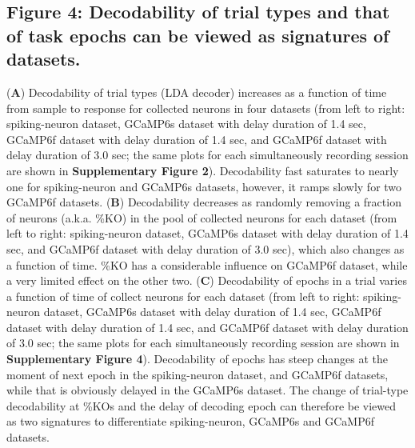 \documentclass[12pt, oneside]{nature}
\begin{document}
\subsection{Figure 4: Decodability of trial types and that of task epochs can be viewed as signatures
of datasets.}
(\textbf{A}) Decodability of trial types (LDA decoder) increases as a function of time from sample to response for 
collected neurons in four datasets (from left to right: spiking-neuron dataset, 
GCaMP6s dataset with delay duration of 1.4 sec,
GCaMP6f dataset with delay duration of 1.4 sec, and GCaMP6f dataset with delay duration of 3.0 sec;
the same plots for each simultaneously recording session are shown in \textbf{Supplementary Figure 2}).
Decodability fast saturates to nearly one for spiking-neuron and GCaMP6s datasets, however, it ramps
slowly for two GCaMP6f datasets. 
(\textbf{B}) Decodability decreases as randomly removing a fraction of neurons (a.k.a. \%KO) in 
the pool of collected neurons for each dataset
(from left to right: spiking-neuron dataset, 
GCaMP6s dataset with delay duration of 1.4 sec,
and GCaMP6f dataset with delay duration of 3.0 sec),
which also changes as a function of time. \%KO has a considerable influence on GCaMP6f dataset, while
a very limited effect on the other two. 
(\textbf{C}) Decodability of epochs in a trial varies a function of time of collect neurons
for each dataset
(from left to right: spiking-neuron dataset, 
GCaMP6s dataset with delay duration of 1.4 sec,
GCaMP6f dataset with delay duration of 1.4 sec, 
and GCaMP6f dataset with delay duration of 3.0 sec;
the same plots for each simultaneously recording session are shown in \textbf{Supplementary Figure 4}). 
Decodability of epochs has steep changes at the moment of next epoch
in the spiking-neuron dataset, and GCaMP6f datasets, while that 
is obviously delayed in the GCaMP6s dataset.
The change of trial-type decodability at \%KOs and 
the delay of decoding epoch can therefore be viewed as two signatures
to differentiate spiking-neuron, GCaMP6s and GCaMP6f datasets.
\end{document}
